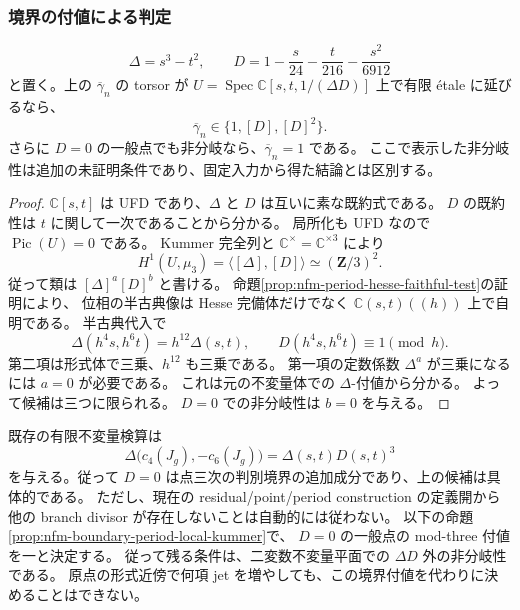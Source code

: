 \subsubsection{境界の付値による判定}

\begin{lemma}[二つの判別境界へ非分岐を絞れた場合の候補]
\label{lem:nfm-period-two-boundary-criterion}
\[
 \Delta=s^3-t^2,\qquad
 D=1-\frac{s}{24}-\frac{t}{216}-\frac{s^2}{6912}
\]
と置く。上の $\overline\gamma_n$ の torsor が
$U=\operatorname{Spec}\mathbb C[s,t,1/(\Delta D)]$ 上で有限 étale に延びるなら、
\[
 \overline\gamma_n\in\{1,[D],[D]^2\}.
\]
さらに $D=0$ の一般点でも非分岐なら、$\overline\gamma_n=1$ である。
ここで表示した非分岐性は追加の未証明条件であり、固定入力から得た結論とは区別する。
\end{lemma}

\begin{proof}
$\mathbb C[s,t]$ は UFD であり、$\Delta$ と $D$ は互いに素な既約式である。
$D$ の既約性は $t$ に関して一次であることから分かる。
局所化も UFD なので $\operatorname{Pic}(U)=0$ である。
Kummer 完全列と $\mathbb C^\times=\mathbb C^{\times3}$ により
\[
 H^1(U,\mu_3)=\langle[\Delta],[D]\rangle\simeq(\mathbf Z/3)^2.
\]
従って類は $[\Delta]^a[D]^b$ と書ける。
命題\ref{prop:nfm-period-hesse-faithful-test}の証明により、
位相の半古典像は Hesse 完備体だけでなく $\mathbb C(s,t)((h))$ 上で自明である。
半古典代入で
\[
 \Delta(h^4s,h^6t)=h^{12}\Delta(s,t),\qquad
 D(h^4s,h^6t)\equiv1\pmod h.
\]
第二項は形式体で三乗、$h^{12}$ も三乗である。
第一項の定数係数 $\Delta^a$ が三乗になるには $a=0$ が必要である。
これは元の不変量体での $\Delta$-付値から分かる。
よって候補は三つに限られる。
$D=0$ での非分岐性は $b=0$ を与える。
\end{proof}

既存の有限不変量検算は
\[
 \Delta\bigl(c_4(J_g),-c_6(J_g)\bigr)
     =\Delta(s,t)D(s,t)^3
\]
を与える。従って $D=0$ は点三次の判別境界の追加成分であり、上の候補は具体的である。
ただし、現在の residual/point/period construction の定義開から
他の branch divisor が存在しないことは自動的には従わない。
以下の命題\ref{prop:nfm-boundary-period-local-kummer}で、
$D=0$ の一般点の mod-three 付値を一と決定する。
従って残る条件は、二変数不変量平面での $\Delta D$ 外の非分岐性である。
原点の形式近傍で何項 jet を増やしても、この境界付値を代わりに決めることはできない。



